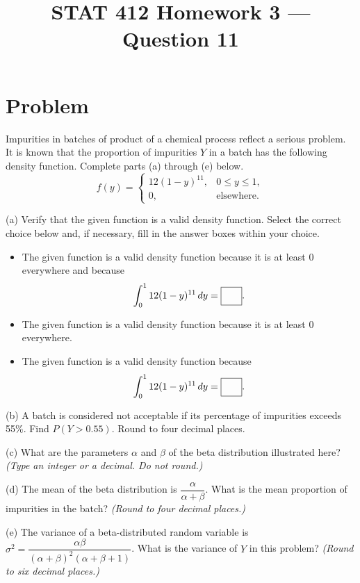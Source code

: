 \documentclass[11pt]{article}
\title{STAT 412 Homework 3 --- Question 11}
\author{}
\date{}
\begin{document}
\maketitle

\section*{Problem}
Impurities in batches of product of a chemical process reflect a serious
problem. It is known that the proportion of impurities $Y$ in a batch has the
following density function. Complete parts (a) through (e) below.
\[
f(y)=
\begin{cases}
12(1-y)^{11},&0\le y\le1,\\
0,&\text{elsewhere}.
\end{cases}
\]

(a) Verify that the given function is a valid density function. Select the
correct choice below and, if necessary, fill in the answer boxes within your
choice.

\begin{itemize}
\item[A.] The given function is a valid density function because it is at least
0 everywhere and because
\[
\int_0^1 12(1-y)^{11}\,dy=\fbox{\strut\hspace{1.5em}}.
\]
\item[B.] The given function is a valid density function because it is at least
0 everywhere.
\item[C.] The given function is a valid density function because
\[
\int_0^1 12(1-y)^{11}\,dy=\fbox{\strut\hspace{1.5em}}.
\]
\end{itemize}

(b) A batch is considered not acceptable if its percentage of impurities
exceeds 55\%. Find $P(Y>0.55)$. Round to four decimal places.

(c) What are the parameters $\alpha$ and $\beta$ of the beta distribution
illustrated here? \textit{(Type an integer or a decimal. Do not round.)}

(d) The mean of the beta distribution is $\dfrac{\alpha}{\alpha+\beta}$. What is
the mean proportion of impurities in the batch?
\textit{(Round to four decimal places.)}

(e) The variance of a beta-distributed random variable is
$\sigma^2=\dfrac{\alpha\beta}{(\alpha+\beta)^2(\alpha+\beta+1)}$. What is the
variance of $Y$ in this problem? \textit{(Round to six decimal places.)}
\end{document}
